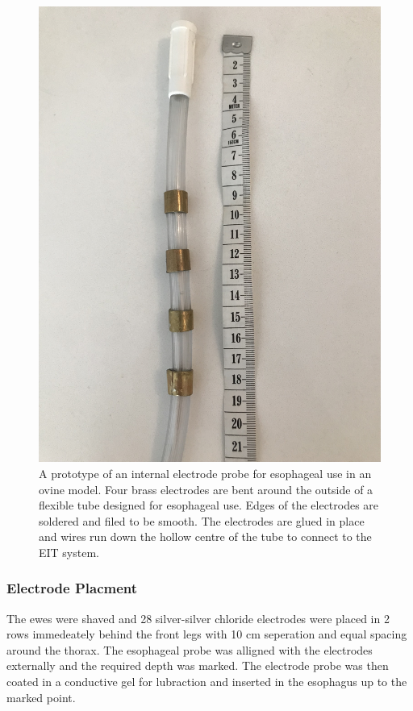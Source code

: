 \begin{figure}
    \centering
	\includegraphics[width=\textwidth, angle =-90]{chapter7-internal_elec_motion/imgs/probe_prototype.jpg} 
	\caption[Probe prototype]{\label{fig:probe_design} 
	A prototype of an internal electrode probe for esophageal use in an ovine model.
	Four brass electrodes are bent around the outside of a flexible tube designed for
	esophageal use. Edges of the electrodes are soldered and filed to be smooth. 
	The electrodes are glued in place and wires run down the hollow centre
	of the tube to connect to the EIT system.}
 \end{figure}

\subsubsection{Electrode Placment}
The ewes were shaved and 28 silver-silver chloride electrodes were placed in 2 rows immedeately behind the front
legs with 10 cm seperation and equal spacing around the thorax. 
The esophageal probe was alligned with the electrodes externally and the required
depth was marked. The electrode probe was then coated in a conductive gel for lubraction and inserted in the 
esophagus up to the marked point.

